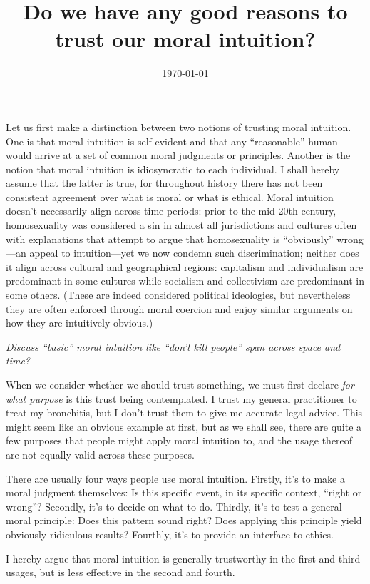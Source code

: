 \documentclass{scrartcl}
\title{Do we have any good reasons to trust our moral intuition?}
\author{\today}
\date{}
\begin{document}
\maketitle

Let us first make a distinction between two notions of trusting moral intuition. One is that moral intuition is self-evident and that any ``reasonable'' human would arrive at a set of common moral judgments or principles. Another is the notion that moral intuition is idiosyncratic to each individual. I shall hereby assume that the latter is true, for throughout history there has not been consistent agreement over what is moral or what is ethical. Moral intuition doesn't necessarily align across time periods: prior to the mid-20th century, homosexuality was considered a sin in almost all jurisdictions and cultures often with explanations that attempt to argue that homosexuality is ``obviously'' wrong---an appeal to intuition---yet we now condemn such discrimination; neither does it align across cultural and geographical regions: capitalism and individualism are predominant in some cultures while socialism and collectivism are predominant in some others. (These are indeed considered political ideologies, but nevertheless they are often enforced through moral coercion and enjoy similar arguments on how they are intuitively obvious.)

\emph{Discuss ``basic'' moral intuition like ``don't kill people'' span across space and time?}

When we consider whether we should trust something, we must first declare \emph{for what purpose} is this trust being contemplated. I trust my general practitioner to treat my bronchitis, but I don't trust them to give me accurate legal advice. This might seem like an obvious example at first, but as we shall see, there are quite a few purposes that people might apply moral intuition to, and the usage thereof are not equally valid across these purposes.

There are usually four ways people use moral intuition. Firstly, it's to make a moral judgment themselves: Is this specific event, in its specific context, ``right or wrong''? Secondly, it's to decide on what to do. Thirdly, it's to test a general moral principle: Does this pattern sound right? Does applying this principle yield obviously ridiculous results? Fourthly, it's to provide an interface to ethics.

I hereby argue that moral intuition is generally trustworthy in the first and third usages, but is less effective in the second and fourth.
\end{document}
